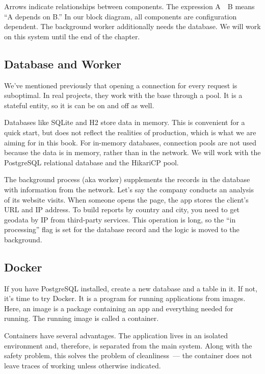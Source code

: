 Arrows indicate relationships between components. The expression A~\arr~B means ``A depends on B.'' In our block diagram, all components are configuration dependent. The background worker additionally needs the database. We will work on this system until the end of the chapter.

\subsection{Database and Worker}

We've mentioned previously that opening a connection for every request is suboptimal. In real projects, they work with the base through a pool. It is a stateful entity, so it is can be on and off as well.


Databases like SQLite and H2 store data in memory. This is convenient for a quick start, but does not reflect the realities of production, which is what we are aiming for in this book. For in-memory databases, connection pools are not used because the data is in memory, rather than in the network. We will work with the PostgreSQL relational database and the HikariCP pool.

The background process (aka worker) supplements the records in the database with information from the network. Let's say the company conducts an analysis of its website visits. When someone opens the page, the app stores the client's URL and IP address. To build reports by country and city, you need to get geodata by IP from third-party services. This operation is long, so the ``in processing'' flag is set for the database record and the logic is moved to the background.

\subsection{Docker}


\label{docker-db}

If you have PostgreSQL installed, create a new database and a table in it. If not, it's time to try Docker. It is a program for running applications from images. Here, an image is a package containing an app and everything needed for running. The running image is called a container.

Containers have several advantages. The application lives in an isolated environment and, therefore, is separated from the main system. Along with the safety problem, this solves the problem of cleanliness~--- the container does not leave traces of working unless otherwise indicated.

